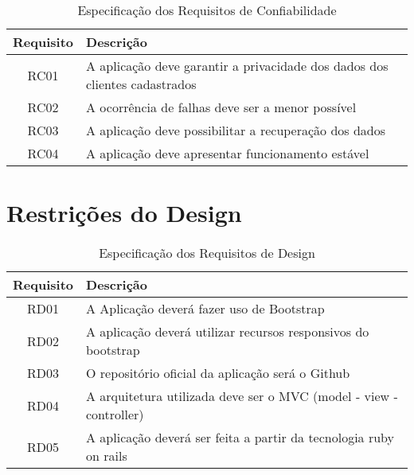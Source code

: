 \begin{apendicesenv}
\begin{table}[H]
                \centering
                \caption{Especificação dos Requisitos de Confiabilidade}
                \begin{tabular}{c|p{10cm}}
                    \hline
                    \textbf{Requisito}            & \textbf{Descrição}\\
                    \hline
                    RC01 & A aplicação deve garantir a privacidade dos dados dos clientes cadastrados\\
                    \hline
                    RC02 & A ocorrência de falhas deve ser a menor possível\\ 
                    \hline
                    RC03 & A aplicação deve possibilitar a recuperação dos dados\\
                    \hline
                    RC04 & A aplicação deve apresentar funcionamento estável\\
                    \hline                   
                \end{tabular}
            \end{table}


{\large {\section { Restrições do Design \\ } } }

\begin{table}[H]
                \centering
                \caption{Especificação dos Requisitos de Design}
                \begin{tabular}{c|p{10cm}}
                    \hline
                    \textbf{Requisito} & \textbf{Descrição}\\
                    \hline
                    RD01 & A Aplicação deverá fazer uso de Bootstrap\\ 
                    \hline
                    RD02 & A aplicação deverá utilizar recursos responsivos do bootstrap\\ 
                    \hline
                    RD03 & O repositório oficial da aplicação será o Github\\
                    \hline
                    RD04 & A arquitetura utilizada deve ser o MVC (model - view - controller)\\
                    \hline
                    RD05 &  A aplicação deverá ser feita a  partir da tecnologia ruby on rails\\
                    \hline                    
                \end{tabular}
            \end{table}


\end{apendicesenv}
